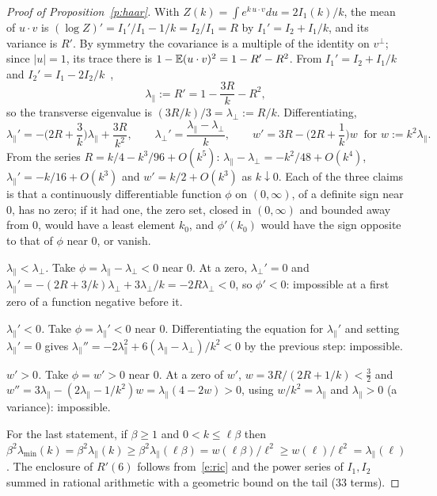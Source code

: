 \begin{proof}[Proof of Proposition~\ref{p:haar}]
With $Z(k)=\int e^{k\,u\cdot v}du=2I_1(k)/k$, the mean of $u\cdot v$ is $(\log Z)'=I_1'/I_1-1/k=I_2/I_1=R$ by
$I_1'=I_2+I_1/k$, and its variance is $R'$. By symmetry the covariance is a multiple of the identity on
$v^\perp$; since $|u|=1$, its trace there is $1-\mathbb{E}(u\cdot v)^2=1-R'-R^2$. From $I_1'=I_2+I_1/k$ and
$I_2'=I_1-2I_2/k$~\cite[10.29.2]{DLMF},
\begin{equation}\label{e:ric}
\lambda_\parallel:=R'=1-\frac{3R}{k}-R^2,
\end{equation}
so the transverse eigenvalue is $(3R/k)/3=\lambda_\perp:=R/k$. Differentiating,
\[
\lambda_\parallel'=-\Big(2R+\frac3k\Big)\lambda_\parallel+\frac{3R}{k^2},\qquad \lambda_\perp'=\frac{\lambda_\parallel-\lambda_\perp}{k},\qquad
w'=3R-\Big(2R+\frac1k\Big)w\ \text{ for }w:=k^2\lambda_\parallel .
\]
From the series $R=k/4-k^3/96+O(k^5)$: $\lambda_\parallel-\lambda_\perp=-k^2/48+O(k^4)$, $\lambda_\parallel'=-k/16+O(k^3)$ and $w'=k/2+O(k^3)$ as
$k\downarrow0$. Each of the three claims is that a continuously differentiable function $\phi$ on $(0,\infty)$,
of a definite sign near $0$, has no zero; if it had one, the zero set, closed in $(0,\infty)$ and bounded away
from $0$, would have a least element $k_0$, and $\phi'(k_0)$ would have the sign opposite to that of $\phi$
near $0$, or vanish.

\emph{$\lambda_\parallel<\lambda_\perp$.} Take $\phi=\lambda_\parallel-\lambda_\perp<0$ near $0$. At a zero, $\lambda_\perp'=0$ and $\lambda_\parallel'=-(2R+3/k)\lambda_\perp+3\lambda_\perp/k=-2R\lambda_\perp<0$, so $\phi'<0$:
impossible at a first zero of a function negative before it.

\emph{$\lambda_\parallel'<0$.} Take $\phi=\lambda_\parallel'<0$ near $0$. Differentiating the equation for $\lambda_\parallel'$ and setting $\lambda_\parallel'=0$ gives
$\lambda_\parallel''=-2\lambda_\parallel^{2}+6(\lambda_\parallel-\lambda_\perp)/k^2<0$ by the previous step: impossible.

\emph{$w'>0$.} Take $\phi=w'>0$ near $0$. At a zero of $w'$, $w=3R/(2R+1/k)<\tfrac32$ and
$w''=3\lambda_\parallel-(2\lambda_\parallel-1/k^2)w=\lambda_\parallel(4-2w)>0$, using $w/k^2=\lambda_\parallel$ and $\lambda_\parallel>0$ (a variance): impossible.

For the last statement, if $\beta\ge1$ and $0<k\le \ell\beta$ then
$\beta^2\lambda_{\min}(k)=\beta^2\lambda_\parallel(k)\ge\beta^2\lambda_\parallel(\ell\beta)=w(\ell\beta)/\ell^2\ge w(\ell)/\ell^2=\lambda_\parallel(\ell)$. The enclosure of $R'(6)$ follows
from~\eqref{e:ric} and the power series of $I_1,I_2$ summed in rational arithmetic with a geometric bound on
the tail (33 terms).
\end{proof}

